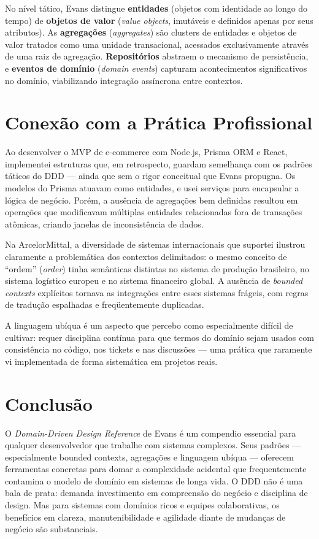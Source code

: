 \documentclass[12pt,a4paper]{article}
\begin{document}
No n\'ivel t\'atico, Evans distingue \textbf{entidades} (objetos com identidade
ao longo do tempo) de \textbf{objetos de valor} (\textit{value objects}, imut\'aveis
e definidos apenas por seus atributos). As \textbf{agrega\c{c}\~oes} (\textit{aggregates})
s\~ao clusters de entidades e objetos de valor tratados como uma unidade transacional,
acessados exclusivamente atrav\'es de uma raiz de agrega\c{c}\~ao. \textbf{Reposit\'orios}
abstraem o mecanismo de persist\^encia, e \textbf{eventos de dom\'inio}
(\textit{domain events}) capturam acontecimentos significativos no dom\'inio,
viabilizando integra\c{c}\~ao assíncrona entre contextos.

\section{Conex\~ao com a Pr\'atica Profissional}

Ao desenvolver o MVP de e-commerce com Node.js, Prisma ORM e React, implementei
estruturas que, em retrospecto, guardam semelhan\c{c}a com os padr\~oes t\'aticos
do DDD --- ainda que sem o rigor conceitual que Evans propugna. Os modelos do
Prisma atuavam como entidades, e usei servi\c{c}os para encapsular a l\'ogica de
neg\'ocio. Por\'em, a aus\^encia de agrega\c{c}\~oes bem definidas resultou em
opera\c{c}\~oes que modificavam m\'ultiplas entidades relacionadas fora de
transa\c{c}\~oes at\^omicas, criando janelas de inconsist\^encia de dados.

Na ArcelorMittal, a diversidade de sistemas internacionais que suportei ilustrou
claramente a problem\'atica dos contextos delimitados: o mesmo conceito de ``ordem''
(\textit{order}) tinha semânticas distintas no sistema de produ\c{c}\~ao brasileiro,
no sistema log\'istico europeu e no sistema financeiro global. A aus\^encia de
\textit{bounded contexts} expl\'icitos tornava as integra\c{c}\~oes entre esses
sistemas fr\'ageis, com regras de tradu\c{c}\~ao espalhadas e freq\"uentemente
duplicadas.

A linguagem ub\'iqua \'e um aspecto que percebo como especialmente dif\'icil de
cultivar: requer disciplina cont\'inua para que termos do dom\'inio sejam usados
com consist\^encia no c\'odigo, nos tickets e nas discuss\~oes --- uma pr\'atica
que raramente vi implementada de forma sistem\'atica em projetos reais.

\section{Conclus\~ao}

O \textit{Domain-Driven Design Reference} de Evans \'e um compendio essencial para
qualquer desenvolvedor que trabalhe com sistemas complexos. Seus padr\~oes ---
especialmente bounded contexts, agrega\c{c}\~oes e linguagem ub\'iqua --- oferecem
ferramentas concretas para domar a complexidade acidental que frequentemente contamina
o modelo de dom\'inio em sistemas de longa vida. O DDD n\~ao \'e uma bala de prata:
demanda investimento em compreens\~ao do neg\'ocio e disciplina de design. Mas para
sistemas com dom\'inios ricos e equipes colaborativas, os benef\'icios em clareza,
manutenibilidade e agilidade diante de mudan\c{c}as de neg\'ocio s\~ao substanciais.
\end{document}
